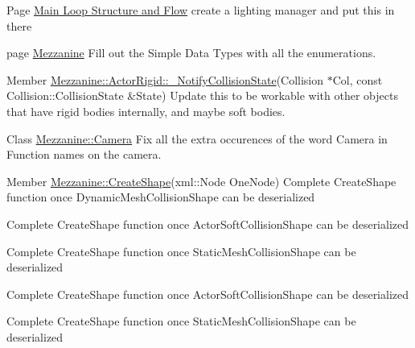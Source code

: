 \label{todo__todo000032}
\hypertarget{todo__todo000032}{}
 
\begin{DoxyDescription}
\item[Page \hyperlink{mainloop1}{Main Loop Structure and Flow} ]create a lighting manager and put this in there 
\end{DoxyDescription}

\label{todo__todo000033}
\hypertarget{todo__todo000033}{}
 
\begin{DoxyDescription}
\item[page \hyperlink{index}{Mezzanine} ]Fill out the Simple Data Types with all the enumerations.
\end{DoxyDescription}

\label{todo__todo000001}
\hypertarget{todo__todo000001}{}
 
\begin{DoxyDescription}
\item[Member \hyperlink{classMezzanine_1_1ActorRigid_a68827280395bc3b9e0266710ec44247d}{Mezzanine::ActorRigid::\_\-NotifyCollisionState}(Collision $\ast$Col, const Collision::CollisionState \&State) ]Update this to be workable with other objects that have rigid bodies internally, and maybe soft bodies. 
\end{DoxyDescription}

\label{todo__todo000003}
\hypertarget{todo__todo000003}{}
 
\begin{DoxyDescription}
\item[Class \hyperlink{classMezzanine_1_1Camera}{Mezzanine::Camera} ]Fix all the extra occurences of the word Camera in Function names on the camera. 
\end{DoxyDescription}

\label{todo__todo000005}
\hypertarget{todo__todo000005}{}
 
\begin{DoxyDescription}
\item[Member \hyperlink{namespaceMezzanine_ac7be2623357ff699de474212404a4227}{Mezzanine::CreateShape}(xml::Node OneNode) ]Complete CreateShape function once DynamicMeshCollisionShape can be deserialized 

Complete CreateShape function once ActorSoftCollisionShape can be deserialized 

Complete CreateShape function once StaticMeshCollisionShape can be deserialized 

Complete CreateShape function once ActorSoftCollisionShape can be deserialized 

Complete CreateShape function once StaticMeshCollisionShape can be deserialized 
\end{DoxyDescription}

